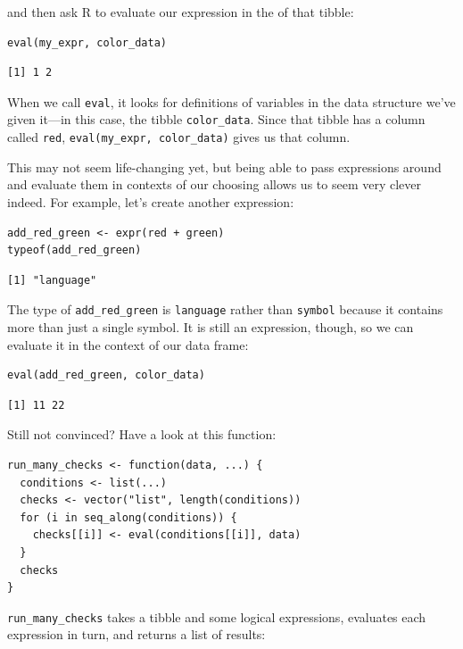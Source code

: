 \noindent
and then ask R to evaluate our expression in the  of that tibble:

\begin{lstlisting}
eval(my_expr, color_data)
\end{lstlisting}

\begin{lstlisting}
[1] 1 2
\end{lstlisting}

When we call \texttt{eval},
it looks for definitions of variables in the data structure we've given it---in this case,
the tibble \texttt{color\_data}.
Since that tibble has a column called \texttt{red},
\texttt{eval(my\_expr, color\_data)} gives us that column.

This may not seem life-changing yet,
but being able to pass expressions around
and evaluate them in contexts of our choosing allows us to seem very clever indeed.
For example,
let's create another expression:

\begin{lstlisting}
add_red_green <- expr(red + green)
typeof(add_red_green)
\end{lstlisting}

\begin{lstlisting}
[1] "language"
\end{lstlisting}

The type of \texttt{add\_red\_green} is \texttt{language} rather than \texttt{symbol}
because it contains more than just a single symbol.
It is still an expression,
though,
so we can evaluate it in the context of our data frame:

\begin{lstlisting}
eval(add_red_green, color_data)
\end{lstlisting}

\begin{lstlisting}
[1] 11 22
\end{lstlisting}

Still not convinced?
Have a look at this function:

\begin{lstlisting}
run_many_checks <- function(data, ...) {
  conditions <- list(...)
  checks <- vector("list", length(conditions))
  for (i in seq_along(conditions)) {
    checks[[i]] <- eval(conditions[[i]], data)
  }
  checks
}
\end{lstlisting}

\noindent
\texttt{run\_many\_checks} takes a tibble and some logical expressions,
evaluates each expression in turn,
and returns a list of results:

